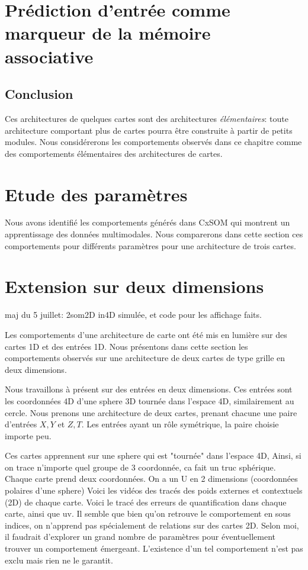 \section{Prédiction d'entrée comme marqueur de la mémoire associative}


\subsection{Conclusion}

Ces architectures de quelques cartes sont des architectures \emph{élémentaires}: toute architecture comportant plus de cartes pourra être construite à partir de petits modules. Nous considérerons les comportements observés dans ce chapitre comme des comportements élémentaires des architectures de cartes.

\section{Etude des paramètres}
Nous avons identifié les comportements générés dans CxSOM qui montrent un apprentissage des données multimodales. Nous comparerons dans cette section ces comportements pour différents paramètres pour une architecture de trois cartes.


\section{Extension sur deux dimensions}

maj du 5 juillet:
2som2D in4D simulée, et code pour les affichage faits.

Les comportements d'une architecture de carte ont été mis en lumière sur des cartes 1D et des entrées 1D. Nous présentons dans cette section les comportements observés sur une architecture de deux cartes de type grille en deux dimensions.

Nous travaillons à présent sur des entrées en deux dimensions. Ces entrées sont les coordonnées 4D d'une sphere 3D tournée dans l'espace 4D, similairement au cercle. Nous prenons une architecture de deux cartes, prenant chacune une paire d'entrées $X,Y$ et $Z,T$. Les entrées ayant un rôle symétrique, la paire choisie importe peu.

Ces cartes apprennent sur une sphere qui est "tournée" dans l'espace 4D, Ainsi, si on trace n'importe quel groupe de 3 coordonnée, ca fait un truc sphérique. Chaque carte prend deux coordonnées.
On a un U en 2 dimensions (coordonnées polaires d'une sphere)
Voici les vidéos des tracés des poids externes et contextuels (2D) de chaque carte.
Voici le tracé des erreurs de quantification dans chaque carte, ainsi que uv.
Il semble que bien qu'on retrouve le comportement en sous indices, on n'apprend pas spécialement de relations sur des cartes 2D. Selon moi, il faudrait d'explorer un grand nombre de paramètres pour éventuellement trouver un comportement émergeant. L'existence d'un tel comportement n'est pas exclu mais rien ne le garantit.